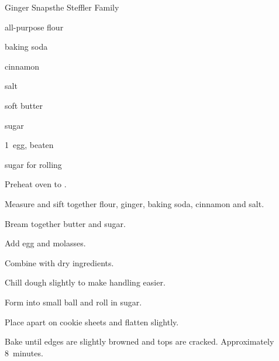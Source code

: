 \begin{recipe}{Ginger Snaps}{the Steffler Family}{}

\begin{ingredients}
\item {} all-purpose flour
\item {} 
\item {} baking soda
\item {} cinnamon
\item \tp{\quarter} salt
\item \C{\threequarter} soft butter
\item {} sugar
\item 1~egg, beaten
\item \C{\half} 
\item sugar for rolling
\end{ingredients}

\begin{directions}
\item Preheat oven to .
\item Measure and sift together flour, ginger, baking soda, cinnamon and salt.
\item Bream together butter and sugar.
\item Add egg and molasses.
\item Combine with dry ingredients.
\item Chill dough slightly to make handling easier.
\item Form into small ball and roll in sugar.
\item Place  apart on cookie sheets and flatten slightly.
\item Bake until edges are slightly browned and tops are cracked. Approximately 8~minutes.
\end{directions}
\end{recipe}
